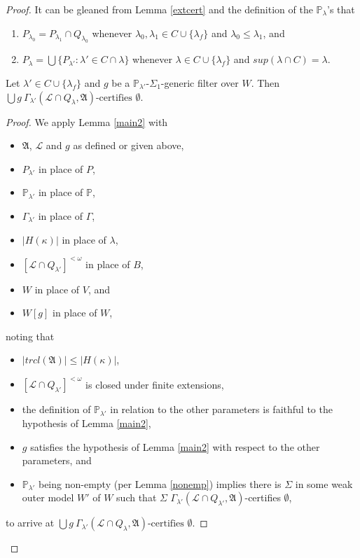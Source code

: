 \documentclass[12pt]{article}
\numberwithin{equation}{section}
\begin{document}
\begin{proof}
It can be gleaned from Lemma \ref{extcert} and the definition of the $\mathbb{P}_{\lambda}$'s that
\begin{enumerate}[label=(P\arabic*), leftmargin=40pt]
    \item\label{p1} $P_{\lambda_0} = P_{\lambda_1} \cap Q_{\lambda_0}$ whenever $\lambda_0, \lambda_1 \in C \cup \{\lambda_f\}$ and $\lambda_0 \leq \lambda_1$, and
    \item\label{p2} $P_{\lambda} = \bigcup \{P_{\lambda'} : \lambda' \in C \cap \lambda\}$ whenever $\lambda \in C \cup \{\lambda_f\}$ and $sup(\lambda \cap C) = \lambda$.
\end{enumerate}

\begin{lem}\label{modeldone}
Let $\lambda' \in C \cup \{\lambda_f\}$ and $g$ be a $\mathbb{P}_{\lambda'}$-$\Sigma_1$-generic filter over $W$. Then $\bigcup g \ \Gamma_{\lambda'} (\mathcal{L} \cap Q_{\lambda}, \mathfrak{A}) \text{-certifies } \emptyset$.
\end{lem}

\begin{proof}
We apply Lemma \ref{main2} with 
\begin{itemize}
    \item $\mathfrak{A}$, $\mathcal{L}$ and $g$ as defined or given above,
    \item $P_{\lambda'}$ in place of $P$,
    \item $\mathbb{P}_{\lambda'}$ in place of $\mathbb{P}$, 
    \item $\Gamma_{\lambda'}$ in place of $\Gamma$,
    \item $|H(\kappa)|$ in place of $\lambda$,
    \item $[\mathcal{L} \cap Q_{\lambda'}]^{< \omega}$ in place of $B$,
    \item $W$ in place of $V$, and
    \item $W[g]$ in place of $W$,
\end{itemize}
noting that
\begin{itemize}
    \item $|trcl(\mathfrak{A})| \leq |H(\kappa)|$,
    \item $[\mathcal{L} \cap Q_{\lambda'}]^{< \omega}$ is closed under finite extensions,
    \item the definition of $\mathbb{P}_{\lambda'}$ in relation to the other parameters is faithful to the hypothesis of Lemma \ref{main2},
    \item $g$ satisfies the hypothesis of Lemma \ref{main2} with respect to the other parameters, and
    \item $\mathbb{P}_{\lambda'}$ being non-empty (per Lemma \ref{nonemp}) implies there is $\Sigma$ in some weak outer model $W'$ of $W$ such that $\Sigma$ $\Gamma_{\lambda'} (\mathcal{L} \cap Q_{\lambda'}, \mathfrak{A})$-certifies $\emptyset$,
\end{itemize}
to arrive at $\bigcup g \ \Gamma_{\lambda'} (\mathcal{L} \cap Q_{\lambda}, \mathfrak{A}) \text{-certifies } \emptyset$.
\end{proof}


\end{proof}
\end{document}
